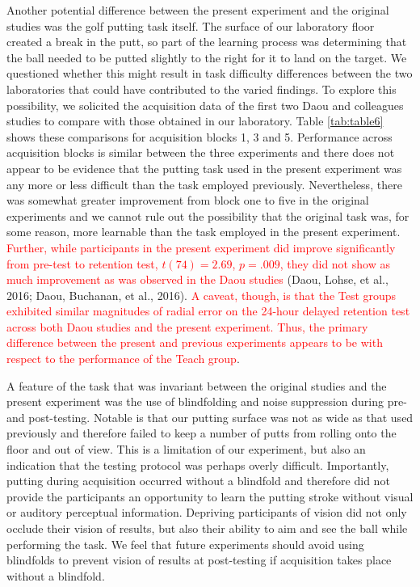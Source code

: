 \documentclass[
  english,
  man,floatsintext]{apa7}
\begin{document}
Another potential difference between the present experiment and the original studies was the golf putting task itself. The surface of our laboratory floor created a break in the putt, so part of the learning process was determining that the ball needed to be putted slightly to the right for it to land on the target. We questioned whether this might result in task difficulty differences between the two laboratories that could have contributed to the varied findings. To explore this possibility, we solicited the acquisition data of the first two Daou and colleagues studies to compare with those obtained in our laboratory. Table \ref{tab:table6} shows these comparisons for acquisition blocks 1, 3 and 5. Performance across acquisition blocks is similar between the three experiments and there does not appear to be evidence that the putting task used in the present experiment was any more or less difficult than the task employed previously. Nevertheless, there was somewhat greater improvement from block one to five in the original experiments and we cannot rule out the possibility that the original task was, for some reason, more learnable than the task employed in the present experiment. \textcolor{red}{Further, while participants in the present experiment did improve significantly from pre-test to retention test,} \textcolor{red}{$t(74) = 2.69$, $p = .009$,} \textcolor{red}{they did not show as much improvement as was observed in the Daou studies} (Daou, Lohse, et al., 2016; Daou, Buchanan, et al., 2016). \textcolor{red}{A caveat, though, is that the Test groups exhibited similar magnitudes of radial error on the 24-hour delayed retention test across both Daou studies and the present experiment. Thus, the primary difference between the present and previous experiments appears to be with respect to the performance of the Teach group}.

A feature of the task that was invariant between the original studies and the present experiment was the use of blindfolding and noise suppression during pre- and post-testing. Notable is that our putting surface was not as wide as that used previously and therefore failed to keep a number of putts from rolling onto the floor and out of view. This is a limitation of our experiment, but also an indication that the testing protocol was perhaps overly difficult. Importantly, putting during acquisition occurred without a blindfold and therefore did not provide the participants an opportunity to learn the putting stroke without visual or auditory perceptual information. Depriving participants of vision did not only occlude their vision of results, but also their ability to aim and see the ball while performing the task. We feel that future experiments should avoid using blindfolds to prevent vision of results at post-testing if acquisition takes place without a blindfold.
\end{document}
